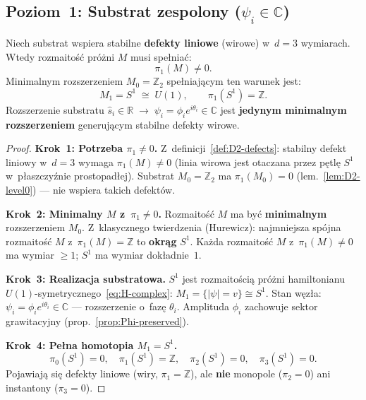 \subsection{Poziom~1: Substrat zespolony ($\psi_i \in \mathbb{C}$)}%
\label{ssec:D2-level1}

\begin{theorem}\label{thm:D2-complex-necessary}

Niech substrat wspiera stabilne \textbf{defekty liniowe}
(wirowe) w~$d = 3$ wymiarach. Wtedy rozmaito\'s\'c pr\'o\.zni
$M$ musi spe\l{}nia\'c:
\begin{equation}\label{eq:D2-pi1-required}
  \pi_1(M) \neq 0.
\end{equation}
Minimalnym rozszerzeniem $M_0 = \mathbb{Z}_2$ spe\l{}niaj\k{a}cym
ten warunek jest:
\begin{equation}\label{eq:D2-M1}
  M_1 = S^1 \;\cong\; U(1),
  \qquad
  \pi_1(S^1) = \mathbb{Z}.
\end{equation}
Rozszerzenie substratu $\hat{s}_i \in \mathbb{R} \;\to\;
\psi_i = \phi_i e^{i\theta_i} \in \mathbb{C}$ jest
\textbf{jedynym minimalnym rozszerzeniem} generuj\k{a}cym
stabilne defekty wirowe.
\end{theorem}

\begin{proof}
\textbf{Krok~1: Potrzeba $\pi_1 \neq 0$.}
Z~definicji~\ref{def:D2-defects}: stabilny defekt liniowy
w~$d = 3$ wymaga $\pi_1(M) \neq 0$
(linia wirowa jest otaczana przez p\k{e}tl\k{e} $S^1$
w~p\l{}aszczy\'znie prostopad\l{}ej).
Substrat $M_0 = \mathbb{Z}_2$ ma $\pi_1(M_0) = 0$ (lem.~\ref{lem:D2-level0})
--- nie wspiera takich defekt\'ow.

\textbf{Krok~2: Minimalny $M$ z~$\pi_1 \neq 0$.}
Rozmaito\'s\'c $M$ ma by\'c \textbf{minimalnym} rozszerzeniem $M_0$.
Z~klasycznego twierdzenia (Hurewicz): najmniejsza sp\'ojna
rozmaito\'s\'c $M$ z~$\pi_1(M) = \mathbb{Z}$ to \textbf{okr\k{a}g} $S^1$.
Ka\.zda rozmaito\'s\'c $M$ z~$\pi_1(M) \neq 0$
ma wymiar $\geq 1$; $S^1$ ma wymiar dok\l{}adnie~$1$.

\textbf{Krok~3: Realizacja substratowa.}
$S^1$ jest rozmaito\'sci\k{a} pr\'o\.zni hamiltonianu
$U(1)$-symetrycznego~\eqref{eq:H-complex}:
$M_1 = \{|\psi| = v\} \cong S^1$.
Stan w\k{e}z\l{}a: $\psi_i = \phi_i e^{i\theta_i} \in \mathbb{C}$
--- rozszerzenie o~faz\k{e} $\theta_i$.
Amplituda $\phi_i$ zachowuje sektor grawitacyjny
(prop.~\ref{prop:Phi-preserved}).

\textbf{Krok~4: Pe\l{}na homotopia $M_1 = S^1$.}
\begin{equation}\label{eq:D2-pi-S1}
  \pi_0(S^1) = 0, \quad
  \pi_1(S^1) = \mathbb{Z}, \quad
  \pi_2(S^1) = 0, \quad
  \pi_3(S^1) = 0.
\end{equation}
Pojawiaj\k{a} si\k{e} defekty liniowe (wiry, $\pi_1 = \mathbb{Z}$),
ale \textbf{nie} monopole ($\pi_2 = 0$) ani instantony ($\pi_3 = 0$).
\end{proof}


